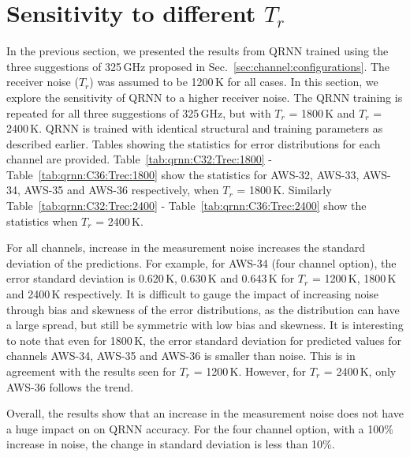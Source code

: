 \documentclass[12pt]{article}
\begin{document}
\section{Sensitivity to different $T_r$}
\label{sec:tr}
%
In the previous section, we presented the results from QRNN trained using the
three suggestions of 325\,GHz proposed in
Sec.~\ref{sec:channel:configurations}. The receiver noise ($T_r$) was
assumed to be 1200\,K for all cases. In this section, we explore the
sensitivity of QRNN to a higher receiver noise. The QRNN training is repeated
for all three suggestions of 325\,GHz, but with $T_r$ = 1800\,K and $T_r$ =
2400\,K. QRNN is trained with identical structural and training parameters as
described earlier. Tables showing the statistics for error distributions for
each channel are provided. Table~\ref{tab:qrnn:C32:Trec:1800} -
Table~\ref{tab:qrnn:C36:Trec:1800} show the statistics for AWS-32, AWS-33,
AWS-34, AWS-35 and AWS-36 respectively, when $T_r$ = 1800\,K. Similarly
Table~\ref{tab:qrnn:C32:Trec:2400} - Table~\ref{tab:qrnn:C36:Trec:2400} show
the statistics when $T_r$ = 2400\,K.

For all channels, increase in the measurement noise increases the standard
deviation of the predictions. For example, for AWS-34 (four channel option),
the error standard deviation is 0.620\,K, 0.630\,K and 0.643\,K for $T_r$ =
1200\,K, 1800\,K and 2400\,K respectively. It is difficult to gauge the impact
of increasing noise through bias and skewness of the error distributions, as
the distribution can have a large spread, but still be symmetric with low bias
and skewness. It is interesting to note that even for 1800\,K, the error
standard deviation for predicted values for channels AWS-34, AWS-35 and AWS-36
is smaller than noise. This is in agreement with the results seen for $T_r$ =
1200\,K. However, for $T_r$ = 2400\,K, only AWS-36 follows the trend.

Overall, the results show that an increase in the measurement noise does not have a huge impact on on QRNN accuracy. For the four channel option, with a 100\% increase in noise, the change in standard deviation is less than 10\%. 
\end{document}
